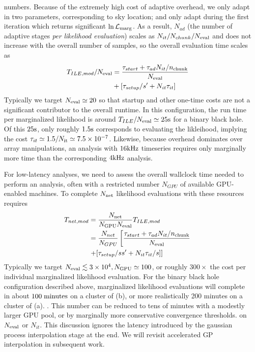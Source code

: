 \documentclass[twocolumn,prd,nofootinbib]{revtex4}
\newcommand\unit[1]{{\rm #1}}
\newcommand\editremark[1]{{\color{red} #1}}
\begin{document}
\editremark{numbers}.  
Because of the extremely high cost of adaptive overhead, we only adapt in two parameters, corresponding to sky location; 
and only adapt during the first iteration which returns significant $\ln {\cal L}_{\rm marg}$.  As a result, $N_{ad}$
(the number of adaptive stages \emph{per likelihood evaluation}) scales as $N_{it}/N_{chunk}/N_{\rm eval}$ and does not
increase with the overall number of samples, so the overall evaluation time scales as
\begin{align}
T_{ILE,mod}/N_{\rm eval} &= \frac{\tau_{start} + \tau_{ad}N_{it}/n_{\rm chunk}}{N_{\rm eval}} 
 \nonumber \\ &
 + 
 [ \tau_{setup}/s'  + N_{it}\tau_{it}
 ] 
\end{align}
Typically we target $N_{\rm eval} \simeq 20$ so that startup and other one-time costs  are not a significant contributor to the overall
runtime.   In this configuration, the run time per marginalized likelihood is around $T_{ILE}/N_{\rm eval} \simeq 25
\unit{s}$ for a binary black hole.    Of this $25 \unit{s}$, only roughly
$1.5\unit{s}$ corresponds to evaluating the likleihood, implying the cost $\tau_{it} \simeq 1.5/N_{\rm it} \simeq
7.5\times 10^{-7}$.
Likewise, because overhead dominates over array manipulations, an analysis with  $16\unit{kHz}$ timeseries requires only
marginally more time than the corresponding $4\unit{kHz}$ analysis.


For low-latency analyses, we need to assess the overall wallclock time needed to perform an analysis, often with a
restricted number $N_{GPU}$ of available GPU-enabled machines.   To  complete $N_{\rm net}$ likelihood evaluations
with these resources requires
\begin{align}
T_{net,mod} &= \frac{N_{\rm net}}{N_{\rm GPU} N_{\rm eval}} T_{ILE,mod} \nonumber \\
& =
  \frac{N_{net}}{N_{GPU}}\left[
\frac{\tau_{start} + \tau_{ad}N_{it}/n_{\rm chunk}}{N_{\rm eval}} 
 \right. \nonumber \\
& \left. + 
 [ \tau_{setup}/ss'  + N_{it}\tau_{it}/s
 ] 
 \right]
\end{align}
Typically we target $N_{\rm eval}  \lesssim 3\times 10^4, N_{\rm GPU} \simeq 100$, or roughly $300\times$ the cost per
individual marginalized likelihood evaluation.  For the binary black hole configuration described above, marginalized
likelihood evaluations will complete in about $100\; \unit{minutes}$ on a cluster of (b), or more realistically 200
minutes on a cluster of (a). . This number can be reduced to
tens of minutes with a modestly larger GPU pool, or by  marginally more conservative convergence thresholds. on $N_{\rm
  eval}$ or $N_{it}$.  
This discussion ignores the latency introduced by the  gaussian process interpolation stage at the end.  We will revisit
accelerated GP interpolation in subsequent work.
\end{document}
